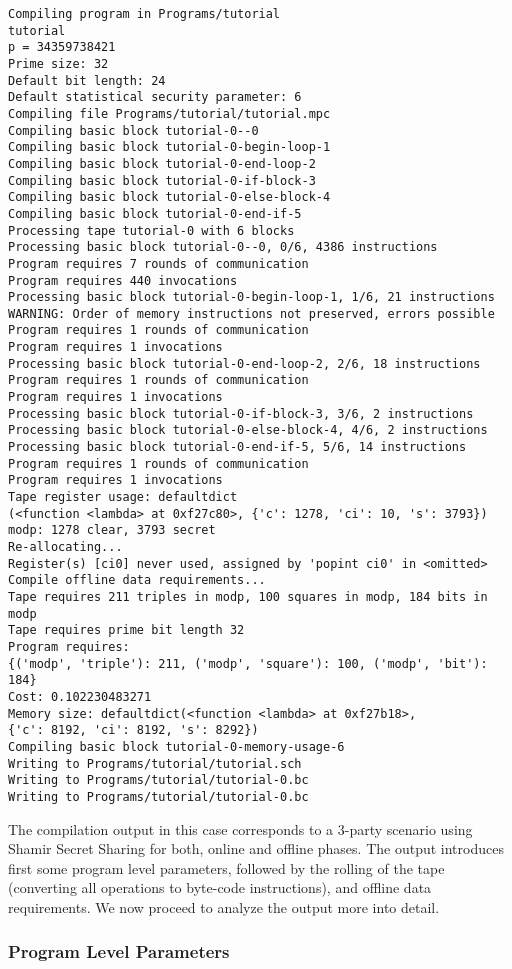 \begin{verbatim}
Compiling program in Programs/tutorial
tutorial
p = 34359738421
Prime size: 32
Default bit length: 24
Default statistical security parameter: 6
Compiling file Programs/tutorial/tutorial.mpc
Compiling basic block tutorial-0--0
Compiling basic block tutorial-0-begin-loop-1
Compiling basic block tutorial-0-end-loop-2
Compiling basic block tutorial-0-if-block-3
Compiling basic block tutorial-0-else-block-4
Compiling basic block tutorial-0-end-if-5
Processing tape tutorial-0 with 6 blocks
Processing basic block tutorial-0--0, 0/6, 4386 instructions
Program requires 7 rounds of communication
Program requires 440 invocations
Processing basic block tutorial-0-begin-loop-1, 1/6, 21 instructions
WARNING: Order of memory instructions not preserved, errors possible
Program requires 1 rounds of communication
Program requires 1 invocations
Processing basic block tutorial-0-end-loop-2, 2/6, 18 instructions
Program requires 1 rounds of communication
Program requires 1 invocations
Processing basic block tutorial-0-if-block-3, 3/6, 2 instructions
Processing basic block tutorial-0-else-block-4, 4/6, 2 instructions
Processing basic block tutorial-0-end-if-5, 5/6, 14 instructions
Program requires 1 rounds of communication
Program requires 1 invocations
Tape register usage: defaultdict
(<function <lambda> at 0xf27c80>, {'c': 1278, 'ci': 10, 's': 3793})
modp: 1278 clear, 3793 secret
Re-allocating...
Register(s) [ci0] never used, assigned by 'popint ci0' in <omitted>
Compile offline data requirements...
Tape requires 211 triples in modp, 100 squares in modp, 184 bits in modp
Tape requires prime bit length 32
Program requires:
{('modp', 'triple'): 211, ('modp', 'square'): 100, ('modp', 'bit'): 184}
Cost: 0.102230483271
Memory size: defaultdict(<function <lambda> at 0xf27b18>,
{'c': 8192, 'ci': 8192, 's': 8292})
Compiling basic block tutorial-0-memory-usage-6
Writing to Programs/tutorial/tutorial.sch
Writing to Programs/tutorial/tutorial-0.bc
Writing to Programs/tutorial/tutorial-0.bc
\end{verbatim}
The compilation output in this case corresponds  to a 3-party scenario using Shamir Secret Sharing for both, online and offline phases.
The output introduces first some program level parameters, followed by the rolling of the tape (converting all operations to byte-code instructions), and offline data requirements. We now proceed to analyze the output more into detail.

\subsubsection{Program Level Parameters}

